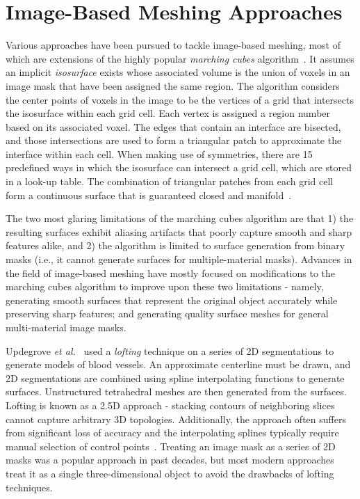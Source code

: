 \section{Image-Based Meshing Approaches}
\label{Image-Based Meshing Approaches}

Various approaches have been pursued to tackle image-based meshing, most of which are extensions of the highly popular \textit{marching cubes} algorithm~\cite{lorensen_1987}. It assumes an implicit \textit{isosurface} exists whose associated volume is the union of voxels in an image mask that have been assigned the same region. The algorithm considers the center points of voxels in the image to be the vertices of a grid that intersects the isosurface within each grid cell. Each vertex is assigned a region number based on its associated voxel. The edges that contain an interface are bisected, and those intersections are used to form a triangular patch to approximate the interface within each cell. When making use of symmetries, there are 15 predefined ways in which the isosurface can intersect a grid cell, which are stored in a look-up table. The combination of triangular patches from each grid cell form a continuous surface that is guaranteed closed and manifold~\cite{young_2008}.

The two most glaring limitations of the marching cubes algorithm are that 1) the resulting surfaces exhibit aliasing artifacts that poorly capture smooth and sharp features alike, and 2) the algorithm is limited to surface generation from binary masks (i.e., it cannot generate surfaces for multiple-material masks). Advances in the field of image-based meshing have mostly focused on modifications to the marching cubes algorithm to improve upon these two limitations - namely, generating smooth surfaces that represent the original object accurately while preserving sharp features; and generating quality surface meshes for general multi-material image masks.

Updegrove \textit{et al.}~\cite{updegrove_2016} used a \textit{lofting} technique on a series of 2D segmentations to generate models of blood vessels. An approximate centerline must be drawn, and 2D segmentations are combined using spline interpolating functions to generate surfaces. Unstructured tetrahedral meshes are then generated from the surfaces. Lofting is known as a 2.5D approach - stacking contours of neighboring slices cannot capture arbitrary 3D topologies. Additionally, the approach often suffers from significant loss of accuracy and the interpolating splines typically require manual selection of control points~\cite{young_2008}. Treating an image mask as a series of 2D masks was a popular approach in past decades, but most modern approaches treat it as a single three-dimensional object to avoid the drawbacks of lofting techniques.

